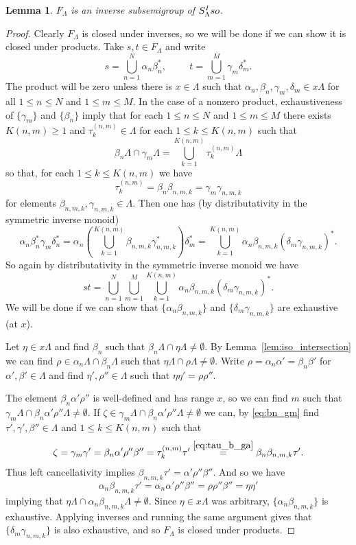 \documentclass[10pt,a4paper]{amsart}
\newtheorem{lemma}{Lemma}
\newcommand{\Iso}{\textup{Iso}}
\renewcommand{\L}{\Lambda}
\renewcommand{\a}{\alpha}
\renewcommand{\b}{\beta}
\newcommand{\de}{\delta}
\newcommand{\ga}{\gamma}
\begin{document}
	\begin{lemma}
		$F_\L$ is an inverse subsemigroup of $S_\L^\Iso$. 
	\end{lemma}

	\begin{proof}
		Clearly $F_\L$ is closed under inverses, so we will be done if we can show it is closed under products. Take $s,t\in F_\L$ and write
		\[
		s = \bigcup_{n=1}^N \a_n\b_n^*, \hspace{1cm} t = \bigcup_{m=1}^M \ga_m\de_m^*.
		\]
		The product will be zero unless there is $x\in \L$ such that $\a_n, \b_n, \ga_m, \de_m\in x\L$ for all $1\leq n\leq N$ and $1\leq m\leq M$. In the case of a nonzero product, exhaustiveness of $\{\ga_m\}$ and $\{\b_n\}$ imply that for each $1\leq n\leq N$ and $1\leq m\leq M$ there exists $K(n,m)\geq 1$ and $\tau_k^{(n,m)}\in \Lambda$ for each $1\leq k\leq K(n,m)$ such that
		\begin{equation}\label{eq:bn_gm}
		\b_n \L \cap \ga_m\L = \bigcup_{k=1}^{K(n,m)} \tau_k^{(n,m)}\L
		\end{equation}
		so that, for each  $1\leq k\leq K(n,m)$ we have
		\begin{equation}\label{eq:tau_b_ga}
		\tau_k^{(n,m)} = \b_n\b_{n,m,k} = \ga_m\ga_{n,m,k}
		\end{equation}
		for elements $\b_{n,m,k}, \ga_{n,m,k}\in \L$. Then one has (by distributativity in the symmetric inverse monoid)
		\[
		\a_n\b_n^*\ga_m\de^*_n = \a_n\left(\bigcup_{k=1}^{K(n,m)}\b_{n,m,k}\ga_{n,m,k}^*\right)\de_m^* = \bigcup_{k=1}^{K(n,m)}\a_n\b_{n,m,k}(\de_m\ga_{n,m,k})^* .
		\]
		So again by distributativity in the symmetric inverse monoid we have
		\[
		st = \bigcup_{n=1}^N\bigcup_{m=1}^M\bigcup_{k=1}^{K(n,m)}\a_n\b_{n,m,k}(\de_m\ga_{n,m,k})^*.
		\]
		We will be done if we can show that $\{\a_n\b_{n,m,k}\}$ and $\{\de_m\ga_{n,m,k}\}$ are exhaustive (at $x$).
		
		Let $\eta\in x\L$ and find $\b_n$ such that $\b_n\L\cap \eta\L\neq\emptyset$. By Lemma~\ref{lem:iso_intersection} we can find $\rho\in \a_n\L\cap\b_n\L$ such that $\eta\L\cap \rho\L\neq \emptyset$. Write $\rho = \a_n\a' = \b_n\b'$ for $\a',\b'\in\Lambda$ and find $\eta', \rho''\in\Lambda$ such that $\eta\eta' = \rho\rho''$. 
		
		The element $\b_n\alpha'\rho''$ is well-defined and has range $x$, so we can find $m$ such that $\ga_m\L\cap \b_n\alpha'\rho''\L\neq\emptyset$. If $\zeta\in \ga_m\L\cap \b_n\alpha'\rho''\L\neq\emptyset$ we can, by \eqref{eq:bn_gm} find $\tau', \ga',\b''\in\L$ and $1\leq k\leq K(n,m)$ such that
		\[
		\zeta = \ga_m\ga' = \b_n\alpha'\rho''\b'' = \tau_k^{(n,m)}\tau' \stackrel{\eqref{eq:tau_b_ga}}{=} \b_n\b_{n,m,k}\tau'.
		\]
		Thus left cancellativity implies $\b_{n,m,k}\tau' = \alpha'\rho''\b''$. And so we have
		\[
		\a_n\b_{n,m,k}\tau' = \a_n\alpha'\rho''\b'' = \rho\rho''\b'' = \eta\eta'
		\]
		implying that $\eta\Lambda\cap \a_n\b_{n,m,k}\Lambda\neq\emptyset$. Since $\eta\in x\L$ was arbitrary, $\{\a_n\b_{n,m,k}\}$ is exhaustive. Applying inverses and running the same argument gives that $\{\de_m\ga_{n,m,k}\}$ is also exhaustive, and so $F_\L$ is closed under products.
	\end{proof}
\end{document}
